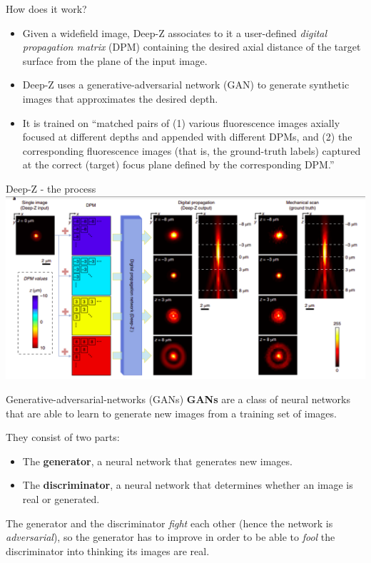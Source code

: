 \documentclass[9pt, aspectratio=169]{beamer}
\begin{document}
\begin{frame}
    {How does it work?}
    \begin{itemize}[<+->]
        \item Given a widefield image, Deep-Z associates to it a user-defined \textit{digital propagation matrix} (DPM) containing the desired axial distance of the target surface from the plane of the input image.
        \item Deep-Z uses a generative-adversarial network (GAN) to generate synthetic images that approximates the desired depth.
        \item It is trained on ``matched pairs of (1) various fluorescence images axially focused at different depths and appended with different DPMs, and (2) the corresponding fluorescence images (that is, the ground-truth labels) captured at the correct (target) focus plane defined by the corresponding DPM.''
    \end{itemize}
\end{frame}

\begin{frame}
    {Deep-Z - the process}
    \includegraphics[width=\textwidth]{deepz_process.png}
\end{frame}
\begin{frame}
    {Generative-adversarial-networks (GANs)}
    \textbf{GANs} are a class of neural networks that are able to learn to generate new images from a training set of images.

    \pause
    They consist of two parts:
    \begin{itemize}
        \item The \textbf{generator}, a neural network that generates new images.
        \item The \textbf{discriminator}, a neural network that determines whether an image is real or generated.
    \end{itemize}

    \pause
    The generator and the discriminator \textit{fight} each other (hence the network is \textit{adversarial}), so the generator has to improve in order to be able to \textit{fool} the discriminator into thinking its images are real.
\end{frame}
\end{document}
